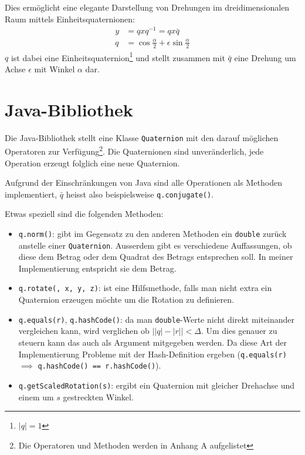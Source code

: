 \documentclass[12pt]{article}
\begin{document}
  Dies ermöglicht eine  elegante Darstellung von Drehungen im dreidimensionalen Raum mittels Einheitsquaternionen:
  \begin{align*}
    y &= q x q^{-1} = q x \bar{q} \\
	q &= \cos{\frac{\alpha}{2}} + \epsilon \sin{\frac{\alpha}{2}}
  \end{align*}
  $q$ ist dabei eine Einheitsquaternion\footnote{$\lvert q \rvert = 1$} und stellt zusammen mit $\bar{q}$ eine Drehung um Achse $\epsilon$ mit Winkel $\alpha$ dar.


  \section{Java-Bibliothek}

  Die Java-Bibliothek stellt eine Klasse \texttt{Quaternion} mit den darauf möglichen Operatoren zur Verfügung\footnote{Die Operatoren und Methoden werden in Anhang A aufgelistet}. Die Quaternionen sind unveränderlich, jede Operation erzeugt folglich eine neue Quaternion.

  Aufgrund der Einschränkungen von Java sind alle Operationen als Methoden implementiert, $\bar{q}$ heisst also beispielsweise \texttt{q.conjugate()}.

  Etwas speziell sind die folgenden Methoden:
  \begin{itemize}
    \item \texttt{q.norm()}: gibt im Gegensatz zu den anderen Methoden ein \texttt{double} zurück anstelle einer \texttt{Quaternion}. Ausserdem gibt es verschiedene Auffassungen, ob diese dem Betrag oder dem Quadrat des Betrags entsprechen soll. In meiner Implementierung entspricht sie dem Betrag.
    \item \texttt{q.rotate(\texttheta, x, y, z)}: ist eine Hilfsmethode, falls man nicht extra ein Quaternion erzeugen möchte um die Rotation zu definieren.
    \item \texttt{q.equals(r)}, \texttt{q.hashCode()}: da man \texttt{double}-Werte nicht direkt miteinander vergleichen kann, wird verglichen ob $\lvert \lvert q \rvert - \lvert r \rvert \rvert < \Delta$. Um dies genauer zu steuern kann das \textdelta auch als Argument mitgegeben werden. Da diese Art der Implementierung Probleme mit der Hash-Definition ergeben (\texttt{q.equals(r)} $\implies$ \texttt{q.hashCode() == r.hashCode()}).
    \item \texttt{q.getScaledRotation(s)}: ergibt ein Quaternion mit gleicher Drehachse und einem um $s$ gestreckten Winkel.
  \end{itemize}
\end{document}

